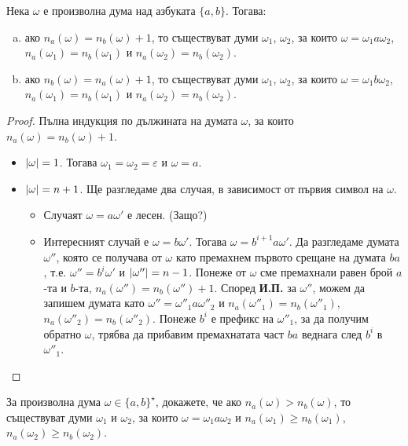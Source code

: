 \begin{problem}
  \label{pr:nanb}
  Нека $\omega$ е произволна дума над азбуката $\{a,b\}$. 
  Тогава:
  \begin{enumerate}[a)]
  \item 
    ако $n_a(\omega) = n_b(\omega) + 1$, то съществуват думи $\omega_1$, $\omega_2$, за които
    $\omega = \omega_1 a \omega_2$, $n_a(\omega_1) = n_b(\omega_1)$ и $n_a(\omega_2) = n_b(\omega_2)$.
  \item
    ако $n_b(\omega) = n_a(\omega) + 1$, то съществуват думи $\omega_1$, $\omega_2$, за които
    $\omega = \omega_1 b \omega_2$, $n_a(\omega_1) = n_b(\omega_1)$ и $n_a(\omega_2) = n_b(\omega_2)$.
  \end{enumerate}
\end{problem}
\begin{proof}
  Пълна индукция по дължината на думата $\omega$, за които $n_a(\omega) = n_b(\omega)+1$.
  \begin{itemize}
  \item 
    $\lvert{\omega}\rvert = 1$. Тогава $\omega_1 = \omega_2 = \varepsilon$ и $\omega = a$.
  \item
    $\lvert{\omega}\rvert = n+1$. Ще разгледаме два случая, в зависимост от първия символ на $\omega$.
    \begin{itemize}
    \item 
      Случаят $\omega = a\omega'$ е лесен. (Защо?)
    \item
      Интересният случай е $\omega = b\omega'$.    
      Тогава $\omega = b^{i+1}a\omega'$. Да разгледаме думата $\omega''$, която се получава от $\omega$
      като премахнем първото срещане на думата $ba$, т.е. 
      $\omega'' = b^i\omega'$ и $\lvert{\omega''}\rvert = n-1$.
      Понеже от $\omega$ сме премахнали равен брой $a$-та и $b$-та, $n_a(\omega'') = n_b(\omega'')+1$.
      Според {\bf И.П.} за $\omega''$, можем да запишем думата като $\omega'' = \omega''_1a\omega''_2$
      и $n_a(\omega''_1) = n_b(\omega''_1)$, $n_a(\omega''_2) = n_b(\omega''_2)$.
      Понеже $b^i$ е префикс на $\omega''_1$, за да получим обратно $\omega$, трябва 
      да прибавим премахнатата част $ba$ веднага след $b^i$ в $\omega''_1$.
    \end{itemize}
  \end{itemize}
\end{proof}

\begin{problem}
  За произволна дума $\omega \in \{a,b\}^\star$, 
  докажете, че ако $n_a(\omega) > n_b(\omega)$, то съществуват думи $\omega_1$ и $\omega_2$,
  за които $\omega = \omega_1 a \omega_2$ и $n_a(\omega_1) \geq n_b(\omega_1)$, $n_a(\omega_2) \geq n_b(\omega_2)$.
\end{problem}

